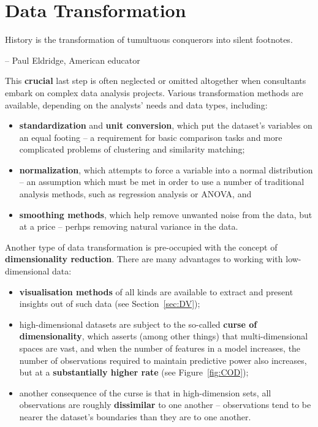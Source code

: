 \section{Data Transformation}
\begin{tcolorbox}[title=It's Also True of Data]
History is the transformation of tumultuous conquerors into silent footnotes. \\[-0.6cm]
\begin{flushright}
-- Paul Eldridge, American educator
\end{flushright}
\end{tcolorbox}
\noindent
This \textbf{crucial} last step is often neglected or omitted altogether when consultants embark on complex data analysis projects. Various transformation methods are available, depending on the analysts' needs and data types, including: \begin{itemize}[noitemsep]
\item \textbf{standardization} and \textbf{unit conversion}, which put the dataset's variables on an equal footing -- a requirement for basic comparison tasks and more complicated problems of clustering and similarity matching;
\item \textbf{normalization}, which  attempts to force a variable into a normal distribution -- an assumption which must be met in order to use a number of traditional analysis methods, such as regression analysis or ANOVA, and 
\item \textbf{smoothing methods}, which help remove unwanted noise from the data, but at a price -- perhps removing natural variance in the data. 
\end{itemize}
Another type of data transformation is pre-occupied with the concept of \textbf{dimensionality reduction}. There are many advantages to working with low-dimensional data:
\begin{itemize}[noitemsep]
\item \textbf{visualisation methods} of all kinds are available to extract and present insights out of such data (see Section~\ref{sec:DV});
\item high-dimensional datasets are subject to the so-called \textbf{curse of dimensionality}, which asserts (among other things) that multi-dimensional spaces are vast, and when the number of features
in a model increases, the number of observations required to maintain predictive
power also increases, but at a \textbf{substantially higher rate} (see Figure~\ref{fig:COD});
\item another consequence of the curse is that in high-dimension sets, all observations are roughly \textbf{dissimilar} to one another -- observations tend to be nearer the dataset's boundaries than they are to one another.  
\end{itemize}
